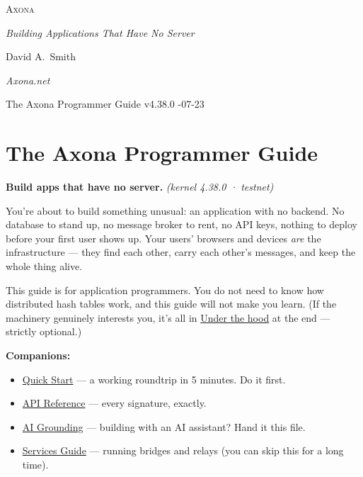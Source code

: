 \documentclass[
  nobib]{tufte-handout}
\author{}
\date{}
\providecommand{\tightlist}{%
  \setlength{\itemsep}{0pt}\setlength{\parskip}{0pt}}
\begin{document}
\thispagestyle{empty}
\null\vfill
\begin{center}
{\fontsize{48}{52}\selectfont \textsc{Axona}\par}
\vspace{0.6em}
{\Large\itshape Building Applications That Have No Server\par}
\vspace{4em}
{\large David A.~Smith\par}
{\itshape\small Axona.net\par}
\vspace{2em}
{\small The Axona Programmer Guide \quad v4.38.0 -07-23\par}
\end{center}
\vfill
\null
\newpage
\pagestyle{ndhtplain}
\thispagestyle{ndhtplain}
\setcounter{page}{1}

\section{The Axona Programmer Guide}\label{the-axona-programmer-guide}

\textbf{Build apps that have no server.} \emph{(kernel 4.38.0 ·
testnet)}

You're about to build something unusual: an application with no backend.
No database to stand up, no message broker to rent, no API keys, nothing
to deploy before your first user shows up. Your users' browsers and
devices \emph{are} the infrastructure --- they find each other, carry
each other's messages, and keep the whole thing alive.

This guide is for application programmers. You do not need to know how
distributed hash tables work, and this guide will not make you learn.
(If the machinery genuinely interests you, it's all in
\hyperref[9-under-the-hood--optional]{Under the hood} at the end ---
strictly optional.)

\textbf{Companions:}

\begin{itemize}
\tightlist
\item
  \href{Quick-Start-v4.38.0.md}{Quick Start} --- a working roundtrip in
  5 minutes. Do it first.
\item
  \href{Axona-API-Reference-v4.38.0.md}{API Reference} --- every
  signature, exactly.
\item
  \href{Axona-AI-Grounding-v4.30.0.md}{AI Grounding} --- building with
  an AI assistant? Hand it this file.
\item
  \href{Axona-Services-Guide-v4.38.0.md}{Services Guide} --- running
  bridges and relays (you can skip this for a long time).
\end{itemize}
\end{document}
